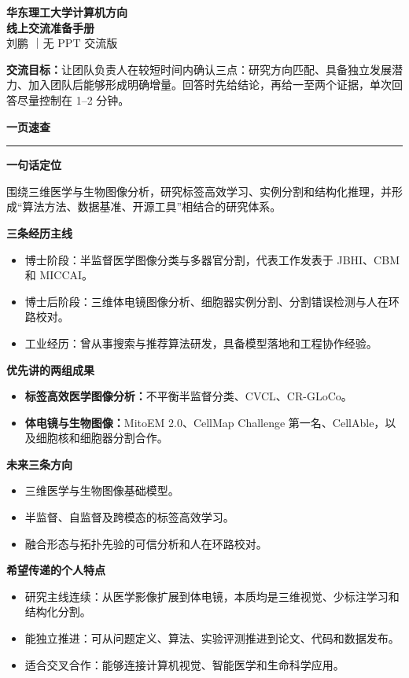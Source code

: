 \documentclass[11pt,a4paper]{ctexart}
\newcommand{\sectionbar}[1]{%
  \vspace{0.35em}
  {\large\bfseries\sffamily\color{accent} #1}\par
  \vspace{-0.35em}\color{accent}\rule{\textwidth}{0.7pt}\color{black}\vspace{0.2em}
}
\newcommand{\prompt}[1]{\textbf{\color{accent}#1}}
\newcommand{\note}[1]{%
  \begin{center}
  \colorbox{light}{\parbox{0.94\textwidth}{#1}}
  \end{center}
}
\begin{document}
\begin{center}
  {\LARGE\bfseries\sffamily 华东理工大学计算机方向}\\[0.25em]
  {\LARGE\bfseries\sffamily 线上交流准备手册}\\[0.6em]
  {\large 刘鹏 \quad｜\quad 无 PPT 交流版}
\end{center}

\note{\textbf{交流目标：}让团队负责人在较短时间内确认三点：研究方向匹配、具备独立发展潜力、加入团队后能够形成明确增量。回答时先给结论，再给一至两个证据，单次回答尽量控制在 1--2 分钟。}

\sectionbar{一页速查}

\prompt{一句话定位}

围绕三维医学与生物图像分析，研究标签高效学习、实例分割和结构化推理，并形成“算法方法、数据基准、开源工具”相结合的研究体系。

\prompt{三条经历主线}
\begin{itemize}
  \item 博士阶段：半监督医学图像分类与多器官分割，代表工作发表于 JBHI、CBM 和 MICCAI。
  \item 博士后阶段：三维体电镜图像分析、细胞器实例分割、分割错误检测与人在环路校对。
  \item 工业经历：曾从事搜索与推荐算法研发，具备模型落地和工程协作经验。
\end{itemize}

\prompt{优先讲的两组成果}
\begin{itemize}
  \item \textbf{标签高效医学图像分析：}不平衡半监督分类、CVCL、CR-GLoCo。
  \item \textbf{体电镜与生物图像：}MitoEM 2.0、CellMap Challenge 第一名、CellAble，以及细胞核和细胞器分割合作。
\end{itemize}

\prompt{未来三条方向}
\begin{itemize}
  \item 三维医学与生物图像基础模型。
  \item 半监督、自监督及跨模态的标签高效学习。
  \item 融合形态与拓扑先验的可信分析和人在环路校对。
\end{itemize}

\prompt{希望传递的个人特点}
\begin{itemize}
  \item 研究主线连续：从医学影像扩展到体电镜，本质均是三维视觉、少标注学习和结构化分割。
  \item 能独立推进：可从问题定义、算法、实验评测推进到论文、代码和数据发布。
  \item 适合交叉合作：能够连接计算机视觉、智能医学和生命科学应用。
\end{itemize}
\end{document}
